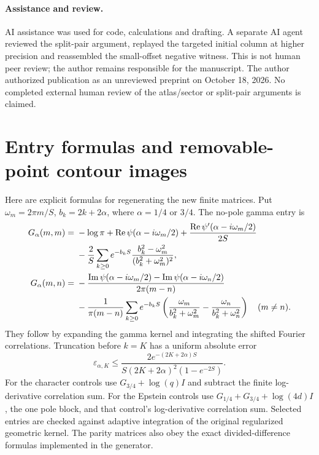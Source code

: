 \documentclass[11pt]{article}
\theoremstyle{remark}
\DeclareMathOperator{\Rea}{Re}
\DeclareMathOperator{\Ima}{Im}
\begin{document}
\paragraph{Assistance and review.} AI assistance was used for code,
calculations and drafting. A separate AI agent reviewed the split-pair
argument, replayed the targeted initial column at higher precision and
reassembled the small-offset negative witness. This is not human peer review;
the author remains responsible for the manuscript. The author authorized
publication as an unreviewed preprint on October 18, 2026. No completed
external human review of the atlas/sector or split-pair arguments is claimed.

\appendix
\section{Entry formulas and removable-point contour images}

Here are explicit formulas for regenerating the new finite matrices.
Put \(\omega_m=2\pi m/S\), \(b_k=2k+2\alpha\), where
\(\alpha=1/4\) or \(3/4\). The no-pole gamma entry is
\begin{align}
 G_\alpha(m,m)
 ={}&-\log\pi+\Rea\psi(\alpha-i\omega_m/2)
       +\frac{\Rea\psi'(\alpha-i\omega_m/2)}{2S}\notag\\
 &-\frac2S\sum_{k\ge0}e^{-b_kS}
                \frac{b_k^2-\omega_m^2}{(b_k^2+\omega_m^2)^2},\label{eq:archdiag}\\
 G_\alpha(m,n)
 ={}&-\frac{\Ima\psi(\alpha-i\omega_m/2)
                    -\Ima\psi(\alpha-i\omega_n/2)}{2\pi(m-n)}
 \notag\\
 &-\frac1{\pi(m-n)}\sum_{k\ge0}e^{-b_kS}
       \left(\frac{\omega_m}{b_k^2+\omega_m^2}
                    -\frac{\omega_n}{b_k^2+\omega_n^2}\right)
       \quad(m\ne n).\label{eq:archoff}
\end{align}
They follow by expanding the gamma kernel and integrating the shifted
Fourier correlations. Truncation before \(k=K\) has a uniform absolute error
\begin{equation}\label{eq:archtail}
 \varepsilon_{\alpha,K}
 \le \frac{2e^{-(2K+2\alpha)S}}
 {S(2K+2\alpha)^2(1-e^{-2S})}.
\end{equation}
For the character controls use \(G_{3/4}+\log(q)I\) and subtract the finite
log-derivative correlation sum. For the Epstein controls use
\(G_{1/4}+G_{3/4}+\log(4d)I\), the one pole block, and that control's
log-derivative correlation sum. Selected entries are checked against
adaptive integration of the original regularized geometric kernel.
The parity matrices also obey the exact divided-difference formulas
implemented in the generator.
\end{document}
